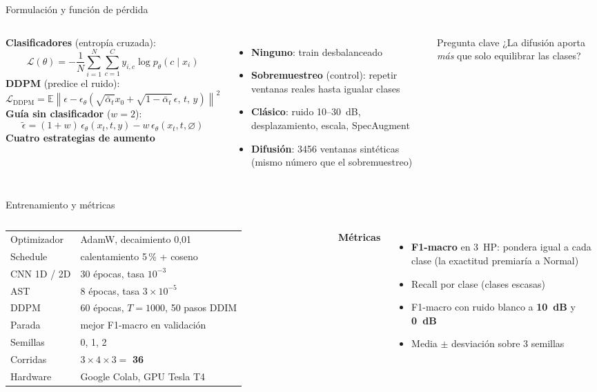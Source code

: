 \documentclass[aspectratio=169,11pt]{beamer}
\newcommand{\num}[1]{\textbf{\color{uni}#1}}
\begin{document}
\begin{frame}{Formulación y función de pérdida}
\begin{columns}[T]
\textbf{Clasificadores} (entropía cruzada):
\[
\mathcal{L}(\theta)=-\frac{1}{N}\sum_{i=1}^{N}\sum_{c=1}^{C} y_{i,c}\log p_\theta(c\mid x_i)
\]
\textbf{DDPM} (predice el ruido):
\[
\mathcal{L}_{\mathrm{DDPM}}=\mathbb{E}\left\|\epsilon-\epsilon_\theta\!\left(\sqrt{\bar\alpha_t}x_0+\sqrt{1-\bar\alpha_t}\,\epsilon,\,t,\,y\right)\right\|^2
\]
\textbf{Guía sin clasificador} ($w=2$):
\[
\tilde\epsilon=(1+w)\,\epsilon_\theta(x_t,t,y)-w\,\epsilon_\theta(x_t,t,\varnothing)
\]
\textbf{Cuatro estrategias de aumento}
\begin{itemize}\small
\item \textbf{Ninguno}: train desbalanceado
\item \textbf{Sobremuestreo} (control): repetir ventanas reales hasta igualar clases
\item \textbf{Clásico}: ruido 10--30~dB, desplazamiento, escala, SpecAugment
\item \textbf{Difusión}: 3456 ventanas sintéticas (mismo número que el sobremuestreo)
\end{itemize}
\begin{exampleblock}{Pregunta clave}
¿La difusión aporta \emph{más} que solo equilibrar las clases?
\end{exampleblock}
\end{columns}
\end{frame}

\begin{frame}{Entrenamiento y métricas}
\begin{columns}[T]
\small
\begin{tabular}{ll}
\toprule
Optimizador & AdamW, decaimiento 0,01 \\
Schedule & calentamiento 5\,\% + coseno \\
CNN 1D / 2D & 30 épocas, tasa $10^{-3}$ \\
AST & 8 épocas, tasa $3\times10^{-5}$ \\
DDPM & 60 épocas, $T=1000$, 50 pasos DDIM \\
Parada & mejor F1-macro en validación \\
Semillas & 0, 1, 2 \\
Corridas & $3\times4\times3=$ \num{36} \\
Hardware & Google Colab, GPU Tesla T4 \\
\bottomrule
\end{tabular}
\textbf{Métricas}
\begin{itemize}\small
\item \textbf{F1-macro} en 3~HP: pondera igual a cada clase (la exactitud premiaría a Normal)
\item Recall por clase (clases escasas)
\item F1-macro con ruido blanco a \textbf{10~dB} y \textbf{0~dB}
\item Media $\pm$ desviación sobre 3 semillas
\end{itemize}
\end{columns}
\end{frame}
\end{document}

